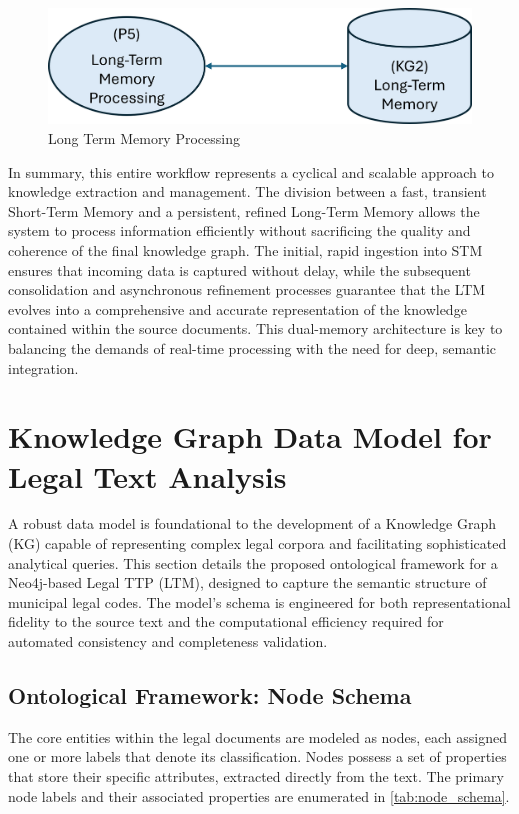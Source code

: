 \begin{figure}[htp]
    \centering
    \includegraphics[width=\linewidth]{figures/chap3_fig/Long Term Memory Processing.png}
    \caption{Long Term Memory Processing}
    \label{fig:Long_Term_Memory_processing}
\end{figure}

In summary, this entire workflow represents a cyclical and scalable approach to knowledge extraction and management. The division between a fast, transient Short-Term Memory and a persistent, refined Long-Term Memory allows the system to process information efficiently without sacrificing the quality and coherence of the final knowledge graph. The initial, rapid ingestion into STM ensures that incoming data is captured without delay, while the subsequent consolidation and asynchronous refinement processes guarantee that the LTM evolves into a comprehensive and accurate representation of the knowledge contained within the source documents. This dual-memory architecture is key to balancing the demands of real-time processing with the need for deep, semantic integration.

\section{Knowledge Graph Data Model for Legal Text Analysis}
A robust data model is foundational to the development of a Knowledge Graph (KG) capable of representing complex legal corpora and facilitating sophisticated analytical queries. This section details the proposed ontological framework for a Neo4j-based Legal TTP (LTM), designed to capture the semantic structure of municipal legal codes. The model's schema is engineered for both representational fidelity to the source text and the computational efficiency required for automated consistency and completeness validation.

\subsection{Ontological Framework: Node Schema}
The core entities within the legal documents are modeled as nodes, each assigned one or more labels that denote its classification. Nodes possess a set of properties that store their specific attributes, extracted directly from the text. The primary node labels and their associated properties are enumerated in \cref{tab:node_schema}.

